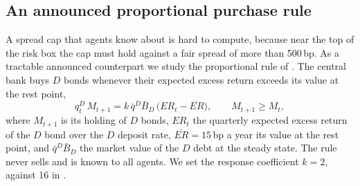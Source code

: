 
\subsection{An announced proportional purchase rule}
\label{sec:res-proportional}

A spread cap that agents know about is hard to compute, because near the top of the risk box
the cap must hold against a fair spread of more than 500\,bp. As a tractable announced
counterpart we study the proportional rule of \citet{bi2026asset}. The central bank
buys $D$ bonds whenever their expected excess return exceeds its value at the rest point,
\begin{equation}
q^{D}_{t}\,M_{t+1}=k\,\bar q^{D}\bar B_{D}\,\bigl(\mathit{ER}_{t}-\overline{\mathit{ER}}\bigr),
\qquad M_{t+1}\ge M_{t},
\label{eq:proportional-rule}
\end{equation}
where $M_{t+1}$ is its holding of $D$ bonds, $\mathit{ER}_t$ the quarterly expected excess
return of the $D$ bond over the $D$ deposit rate, $\overline{\mathit{ER}}=15$\,bp a year its
value at the rest point, and $\bar q^{D}\bar B_D$ the market value of the $D$ debt at the
steady state. The rule never sells and is known to all agents. We set the response coefficient
$k=2$, against 16 in \citet{bi2026asset}.

